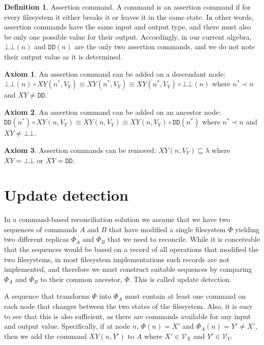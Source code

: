 \documentclass[12pt]{article}
\newcommand{\setvx}[1]{\mathcal{V}_{#1}}
\newcommand{\empt}{\bot}
\newcommand{\FS}{\Phi} %
\newcommand{\nn}{n^*} %
\newcommand{\fscommand}[2]{{#1#2}}
\newcommand{\fsregcommandchar}[1]{\mathtt{#1}}
\newcommand{\fsregcommand}[2]{\fscommand{\fsregcommandchar{#1}}{\fsregcommandchar{#2}}}
\newcommand{\cbb}{\fsregcommand{\empt}{\empt}}
\newcommand{\cdd}{\fsregcommand{D}{D}}
\newcommand{\cxy}{\fscommand{X}{Y}}
\newcommand{\cc}{\circ} %
\newcommand{\descendant}{\prec}
\newcommand{\eqext}{\sqsubseteq} %
\newcommand{\emptyseq}{\lambda} %
\theoremstyle{definition}
\newtheorem{mydef}{Definition}
\newtheorem{myax}{Axiom}
\begin{document}
\begin{mydef}{Assertion command.}
A command is an assertion command if
for every filesystem it either breaks it or leaves it in the same state.
In other words, assertion commands have the same input and output type,
and there must also be only one possible value for their output.
Accordingly, in our current algebra, $\cbb(n)$ and $\cdd(n)$ are the only two assertion commands,
and we do not note their output value as it is determined.
\end{mydef}

\begin{myax}\label{ax_child_assert}
An assertion command can be added on a descendant node:
$\cbb(n)\cc \cxy(\nn,V_Y) \equiv \cxy(\nn,V_Y) \equiv \cxy(\nn,V_Y)\cc \cbb(n)$ 
where $\nn\descendant n$ and $\cxy\neq\cdd$.
\end{myax}

\begin{myax}\label{ax_parent_assert}
An assertion command can be added on an ancestor node:
$\cdd(\nn)\cc \cxy(n,V_Y) \equiv \cxy(n,V_Y) \equiv \cxy(n,V_Y)\cc \cdd(\nn)$ 
where $\nn\descendant n$ and $\cxy\neq\cbb$.
\end{myax}

\begin{myax}\label{ax_assert}
Assertion commands can be removed:
$\cxy(n,V_Y) \eqext \emptyseq$ where $\cxy=\cbb$ or $\cxy=\cdd$.
\end{myax}



\section{Update detection}

In a command-based reconciliation solution we assume that we have two sequences of commands
$A$ and $B$ that have modified a single filesystem $\FS$ yielding two different replicas $\FS_A$ and $\FS_B$ that we
need to reconcile. While it is conceivable that the sequences would be based on a record of
all operations that modified the two filesystems, in most filesystem implementations
such records are not implemented, and therefore we must construct suitable sequences
by comparing $\FS_A$ and $\FS_B$ to their common ancestor, $\FS$. This is called update detection.

A sequence that transforms $\FS$ into $\FS_A$ must contain at least one command on each node
that changes between the two states of the filesystem. Also, it is easy to see that this is also
sufficient, as there are commands available for any input and output value. 
Specifically, if at node $n$, $\FS(n)=X'$ and $\FS_A(n)=Y'\neq X'$, then we add the command $\cxy(n,Y')$ to $A$
where $X'\in\setvx{X}$ and $Y'\in\setvx{Y}$.
\end{document}
